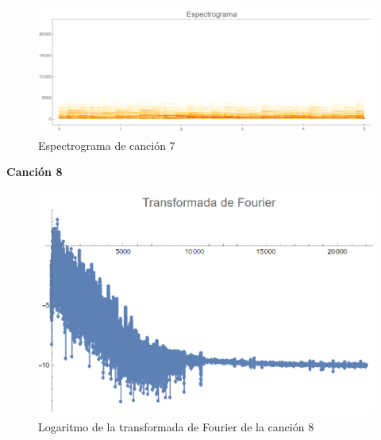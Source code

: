 \documentclass[12pt, letterpaper]{article}
\begin{document}
\begin{figure}[H]
  \centering
  \includegraphics[width=.9\linewidth]{imgs/Cancion7/espectrograma.png}
  \caption{Espectrograma de canción 7}
  \label{fig:07i}
\end{figure}

\textbf{\large{Canción 8}}
\begin{figure}[H]
  \centering
  \includegraphics[width=0.7\linewidth]{imgs/Cancion8/transformada.png}
  \caption{Logaritmo de la transformada de Fourier de la canción 8}
  \label{fig:08a}
\end{figure}
\end{document}

